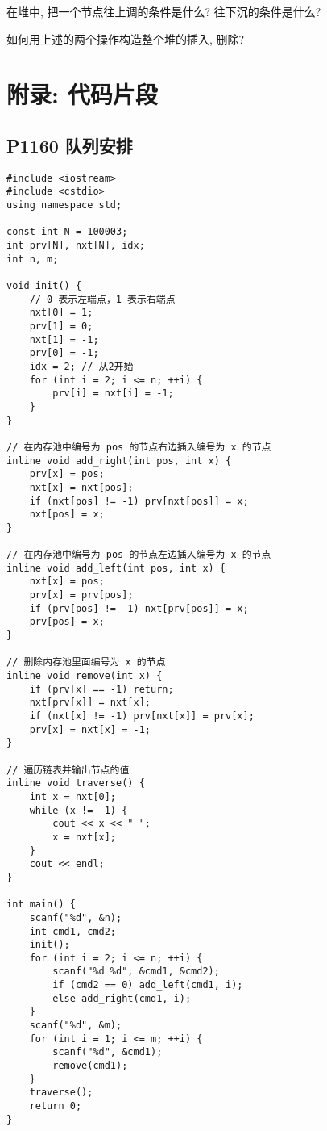 \documentclass{ctexart}
\begin{document}
\begin{exc}
    在堆中, 把一个节点往上调的条件是什么? 往下沉的条件是什么?
\end{exc}


\begin{exc}
    如何用上述的两个操作构造整个堆的插入, 删除?
\end{exc}

\section{附录: 代码片段}

\subsection{P1160 队列安排}

\begin{lstlisting}
#include <iostream>
#include <cstdio>
using namespace std;

const int N = 100003;
int prv[N], nxt[N], idx;
int n, m;

void init() {
    // 0 表示左端点，1 表示右端点
    nxt[0] = 1;
    prv[1] = 0;
    nxt[1] = -1;
    prv[0] = -1;
    idx = 2; // 从2开始
    for (int i = 2; i <= n; ++i) {
        prv[i] = nxt[i] = -1;
    }
}

// 在内存池中编号为 pos 的节点右边插入编号为 x 的节点
inline void add_right(int pos, int x) {
    prv[x] = pos;
    nxt[x] = nxt[pos];
    if (nxt[pos] != -1) prv[nxt[pos]] = x;
    nxt[pos] = x;
}

// 在内存池中编号为 pos 的节点左边插入编号为 x 的节点
inline void add_left(int pos, int x) {
    nxt[x] = pos;
    prv[x] = prv[pos];
    if (prv[pos] != -1) nxt[prv[pos]] = x;
    prv[pos] = x;
}

// 删除内存池里面编号为 x 的节点
inline void remove(int x) {
    if (prv[x] == -1) return;
    nxt[prv[x]] = nxt[x];
    if (nxt[x] != -1) prv[nxt[x]] = prv[x];
    prv[x] = nxt[x] = -1;
}

// 遍历链表并输出节点的值
inline void traverse() {
    int x = nxt[0];
    while (x != -1) {
        cout << x << " ";
        x = nxt[x];
    }
    cout << endl;
}

int main() {
    scanf("%d", &n);
    int cmd1, cmd2;
    init();
    for (int i = 2; i <= n; ++i) {
        scanf("%d %d", &cmd1, &cmd2);
        if (cmd2 == 0) add_left(cmd1, i);
        else add_right(cmd1, i);
    }
    scanf("%d", &m);
    for (int i = 1; i <= m; ++i) {
        scanf("%d", &cmd1);
        remove(cmd1);
    }
    traverse();
    return 0;
}

\end{lstlisting}
\end{document}
